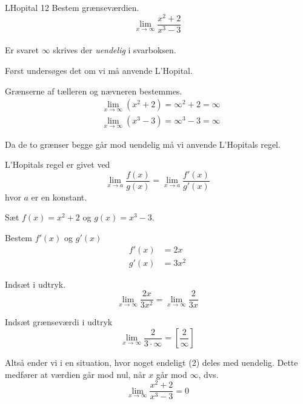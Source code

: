 \documentclass{article}
\begin{document}
\begin{exercise}{LHopital 12}
	Bestem grænseværdien.
	\[
	\lim_{x \to \infty} \frac{x^2 + 2}{x^3 - 3}
	\] 
	\\
	Er svaret $\infty$ skrives der \emph{uendelig} i svarboksen.
	
	
	\hint
	Først undersøges det om vi må anvende L'Hopital.
	
	\hint
	Grænserne af tælleren og nævneren bestemmes.
	\begin{align*}
		&\lim_{x \to \infty} (x^2 + 2) = \infty ^2 + 2 = \infty \\
		&\lim_{x \to \infty} (x^3 - 3) = \infty ^3 - 3 = \infty
	\end{align*}
	
	\hint
	Da de to grænser begge går mod uendelig må vi  anvende L'Hopitals regel. 
	
	\hint
	L'Hopitals regel er givet ved
	\[
	\lim_{x \to a} \frac{f(x)}{g(x)} = \lim_{x \to a} \frac{f'(x)}{g'(x)} 
	\]
	hvor $a$  er en konstant.
	
	\hint
	Sæt $f(x) = x^2 + 2$ og $g(x) = x^3 - 3$. 
	
	\hint
	Bestem $f'(x)$ og $g'(x)$
	\begin{align*}
		f'(x) &= 2x \\
		g'(x) &= 3x^2
	\end{align*}
	
	\hint
	Indsæt i udtryk.
	\[
	\lim_{x \to \infty} \frac{2x}{3x^2} = \lim_{x \to \infty} \frac{2}{3x} 
	\]
	
	\hint
	Indsæt grænseværdi i udtryk
	\[
	\lim_{x \to \infty} \frac{2}{3 \cdot \infty}  = \left[ \frac{2}{\infty}  \right] 
	\]
	
	\hint
	Altså ender vi i en situation, hvor noget endeligt (2) deles med uendelig. Dette medfører at værdien går mod nul, når $x$ går mod $\infty$, dvs.
	\[
	\lim_{x \to \infty} \frac{x^2 + 2}{x^3 - 3} = 0
	\]
	
\end{exercise}
\end{document}
